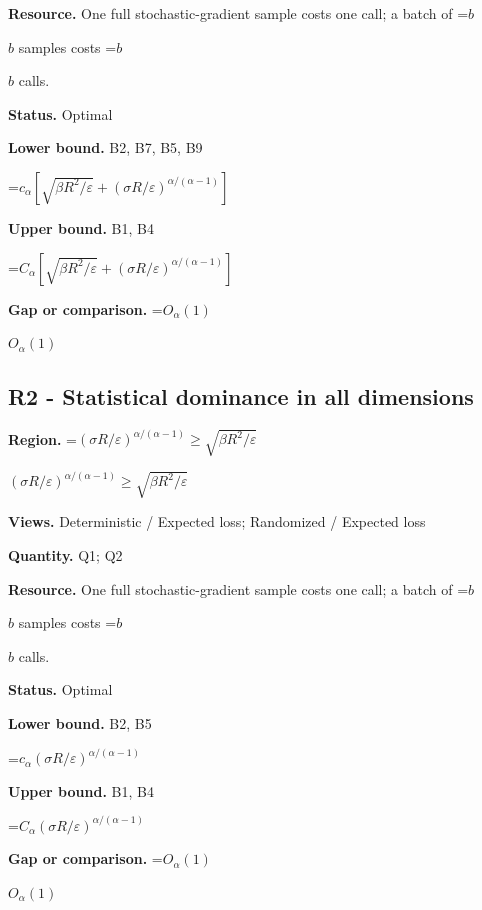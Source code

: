 \documentclass[10pt,a4paper]{article}
\newcommand{\AtlasMath}[1]{\par\begingroup\centering\setbox0=\hbox{$\displaystyle #1$}\ifdim\wd0>1.4\linewidth\typeout{ATLAS WIDE FORMULA: \the\wd0}\fi\ifdim\wd0>\linewidth\resizebox{\linewidth}{!}{\box0}\else\box0\fi\par\endgroup}
\newcommand{\AtlasInlineMath}[1]{\begingroup\setbox0=\hbox{$#1$}\ifdim\wd0>.4\linewidth\endgroup\AtlasMath{#1}\else\endgroup$#1$\fi}
\begin{document}
\textbf{Resource.} One full stochastic-gradient sample costs one call; a batch of \AtlasInlineMath{b} samples costs \AtlasInlineMath{b} calls.



\textbf{Status.} Optimal



\textbf{Lower bound.} B2, B7, B5, B9



\AtlasMath{c_\alpha[\sqrt{\beta R^2/\varepsilon}+(\sigma R/\varepsilon)^{\alpha/(\alpha-1)}]}


\textbf{Upper bound.} B1, B4



\AtlasMath{C_\alpha[\sqrt{\beta R^2/\varepsilon}+(\sigma R/\varepsilon)^{\alpha/(\alpha-1)}]}


\textbf{Gap or comparison.} \AtlasInlineMath{O_\alpha(1)}



\subsection{R2 - Statistical dominance in all dimensions}


\textbf{Region.} \AtlasInlineMath{(\sigma R/\varepsilon)^{\alpha/(\alpha-1)}\ge \sqrt{\beta R^2/\varepsilon}}



\textbf{Views.} Deterministic / Expected loss; Randomized / Expected loss



\textbf{Quantity.} Q1; Q2



\textbf{Resource.} One full stochastic-gradient sample costs one call; a batch of \AtlasInlineMath{b} samples costs \AtlasInlineMath{b} calls.



\textbf{Status.} Optimal



\textbf{Lower bound.} B2, B5



\AtlasMath{c_\alpha (\sigma R/\varepsilon)^{\alpha/(\alpha-1)}}


\textbf{Upper bound.} B1, B4



\AtlasMath{C_\alpha (\sigma R/\varepsilon)^{\alpha/(\alpha-1)}}


\textbf{Gap or comparison.} \AtlasInlineMath{O_\alpha(1)}
\end{document}
